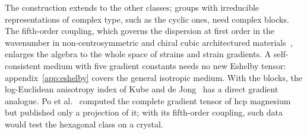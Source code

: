 The construction extends to the other classes; groups with irreducible representations
of complex type, such as the cyclic ones, need complex blocks. The fifth-order coupling,
which governs the dispersion at first order in the wavenumber in non-centrosymmetric and
chiral cubic architectured materials~\cite{Rosi2024}, enlarges the algebra to the whole space of strains and strain
gradients. A self-consistent medium with five gradient constants needs no new Eshelby tensor:
appendix~\ref{app:eshelby} covers the general isotropic medium. With the blocks, the
log-Euclidean anisotropy index of Kube and de
Jong~\cite[eq.~(20)]{Kube2016} has a direct gradient analogue. Po et
al.~\cite{Po2018} computed the complete gradient tensor of hcp magnesium but published only
a projection of it; with its fifth-order coupling, such data would test the hexagonal class
on a crystal.
